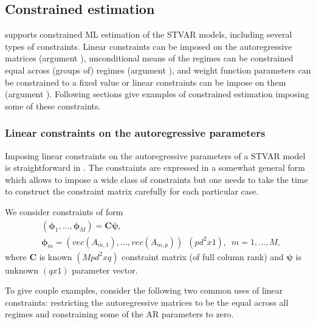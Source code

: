 \documentclass[nojss]{jss}
\begin{document}
\subsection{Constrained estimation}\label{sec:examp_const}
 supports constrained ML estimation of the STVAR models, including several types of constraints. Linear constraints can be imposed on the autoregressive matrices (argument ), unconditional means of the regimes can be constrained equal across (groups of) regimes (argument ), and weight function parameters can be constrained to a fixed value or linear constraints can be impose on them (argument ). Following sections give examples of constrained estimation imposing some of these constraints.

\subsubsection{Linear constraints on the autoregressive parameters}

Imposing linear constraints on the autoregressive parameters of a STVAR model is straightforward in . The constraints are expressed in a somewhat general form which allows to impose a wide class of constraints but one needs to take the time to construct the constraint matrix carefully for each particular case.

We consider constraints of form
\begin{align}
& (\boldsymbol{\phi}_1,...,\boldsymbol{\phi}_M) = \boldsymbol{C}\boldsymbol{\psi},\\
& \boldsymbol{\phi}_m=(vec(A_{m,1}),...,vec(A_{m,p}))\enspace (pd^2x1), \enspace m=1,...,M,
\end{align}
where $\boldsymbol{C}$ is known $(Mpd^2xq)$ constraint matrix (of full column rank) and $\boldsymbol{\psi}$ is unknown $(qx1)$ parameter vector.

To give couple examples, consider the following two common uses of linear constraints: restricting the autoregressive matrices to be the equal across all regimes and constraining some of the AR parameters to zero.
\end{document}
